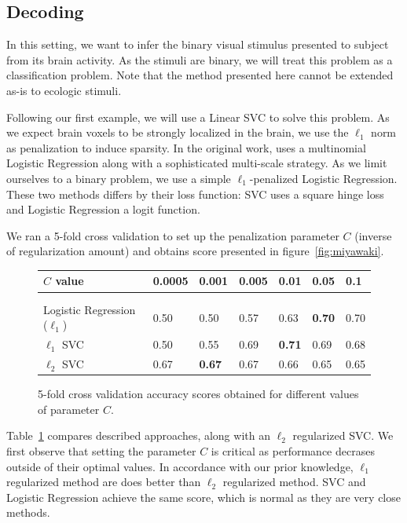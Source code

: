 \documentclass{frontiersSCNS} %
\begin{document}
\subsection{Decoding}

In this setting, we want to infer the binary visual stimulus presented to
subject from its brain activity.
As the stimuli are binary, we will treat this problem as a classification
problem. Note that the method presented here cannot be extended as-is to
ecologic stimuli. 

Following our first example, we will use a Linear SVC to solve this problem.
As we expect brain voxels to be strongly localized in the brain, we use the
$\ell_1$ norm as penalization to induce sparsity.
In the original work, \cite{miyawaki2008} uses a multinomial Logistic Regression
along with a sophisticated multi-scale strategy. As we limit ourselves to a
binary problem, we use a simple $\ell_1$-penalized Logistic Regression.
These two methods differs by their loss function: SVC uses a square hinge loss
and Logistic Regression a logit function.

We ran a 5-fold cross validation to set up the penalization parameter $C$
(inverse of regularization amount) and obtains score presented in
figure~\ref{fig:miyawaki}.

\begin{figure}[htbp]
    \begin{center}
    \begin{tabular}{l|llllll}
        $C$ value           & 0.0005 & 0.001  & 0.005  & 0.01   & 0.05    & 0.1    \\
    \hline\\[-.9em]
    \hline\\[-.7em]
        Logistic Regression ($\ell_1$) & 0.50 & 0.50 & 0.57 & 0.63 &
                              \textbf{0.70} & 0.70 \\[.1em]
        $\ell_1$ SVC        & 0.50 & 0.55 & 0.69 &
                              \textbf{0.71} & 0.69 & 0.68 \\[.1em]
        $\ell_2$ SVC        & 0.67 & \textbf{0.67} &
                              0.67 & 0.66 & 0.65 & 0.65
    \end{tabular}
    \end{center}
    \caption{5-fold cross validation accuracy scores obtained for different
    values of parameter $C$.}
    \label{fig:miyawaki_cv}
\end{figure}

Table~\ref{fig:miyawaki_cv} compares described approaches, along with an
$\ell_2$ regularized SVC. We first observe that setting the parameter $C$ is
critical as performance decrases outside of their optimal values.
In accordance with our prior knowledge, $\ell_1$
regularized method are does better than $\ell_2$ regularized method. SVC and
Logistic Regression achieve the same score, which is normal as they are very
close methods.
\end{document}
